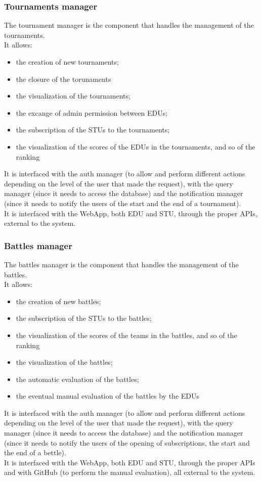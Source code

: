 \subsubsection*{Tournaments manager}
The tournament manager is the component that handles the management of the tournaments.\\
It allows:
\begin{itemize}
    \item the creation of new tournaments;
    \item the closure of the torunaments
    \item the visualization of the tournaments;
    \item the excange of admin permission between EDUs;
    \item the subscription of the STUs to the tournaments;
    \item the visualization of the scores of the EDUs in the tournaments, and so of the ranking
\end{itemize}
It is interfaced with the auth manager (to allow and perform different actions depending on the level of the user that made the request), with the query manager (since it needs to access the database) and the notification manager (since it needs to notify the users of the start and the end of a tournament).\\
It is interfaced with the WebApp, both EDU and STU, through the proper APIs, external to the system.

\subsubsection*{Battles manager}
The battles manager is the component that handles the management of the battles.\\
It allows:
\begin{itemize}
    \item the creation of new battles;
    \item the subscription of the STUs to the battles;
    \item the visualization of the scores of the teams in the battles, and so of the ranking
    \item the visualization of the battles;
    \item the automatic evaluation of the battles;
    \item the eventual manual evaluation of the battles by the EDUs
\end{itemize}
It is interfaced with the auth manager (to allow and perform different actions depending on the level of the user that made the request), with the query manager (since it needs to access the database) and the notification manager (since it needs to notify the users of the opening of subscriptions, the start and the end of a bettle).\\
It is interfaced with the WebApp, both EDU and STU, through the proper APIs and with GitHub (to perform the manual evaluation), all external to the system.

